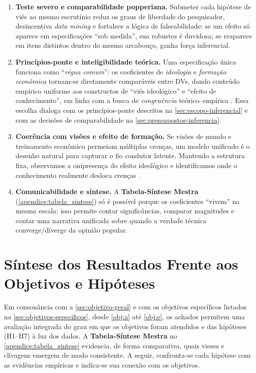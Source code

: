 \begin{enumerate}[label=\roman*)]
\item \textbf{Teste severo e comparabilidade popperiana.} Submeter cada hipótese de viés ao mesmo escrutínio reduz os graus de liberdade do pesquisador, desincentiva \emph{data mining} e fortalece a lógica de falseabilidade: se um efeito só aparece em especificações “sob medida”, sua robustez é duvidosa; se reaparece em itens distintos dentro do mesmo arcabouço, ganha força inferencial.

\item \textbf{Princípios-ponte e inteligibilidade teórica.} Uma especificação única funciona como “\emph{régua comum}”: os coeficientes de \emph{ideologia} e \emph{formação econômica} tornam-se diretamente comparáveis entre DVs, dando conteúdo empírico uniforme aos constructos de “viés ideológico” e “efeito de conhecimento”, em linha com a busca de \emph{congruência} teórico–empírica \cite{stigum2003}. Essa escolha dialoga com os princípios-ponte descritos na \autoref{sec:escopo-inferencial} e com as decisões de comparabilidade na \autoref{sec:pressupostos-inferencia}.

\item \textbf{Coerência com visões e efeito de formação.} Se visões de mundo e treinamento econômico permeiam múltiplas crenças, um modelo unificado é o desenho natural para capturar o fio condutor latente. Mantendo a estrutura fixa, observamos a onipresença do efeito ideológico e identificamos onde o conhecimento realmente desloca crenças \cite{sowell2007conflict,newman2020ideia}. 

\item \textbf{Comunicabilidade e síntese.} A \textbf{Tabela-Síntese Mestra} (\autoref{apendice:tabela_sintese}) só é possível porque os coeficientes “vivem” na mesma escala: isso permite contar significâncias, comparar magnitudes e contar uma narrativa unificada sobre quando a verdade técnica converge/diverge da opinião popular.
\end{enumerate}

\section{Síntese dos Resultados Frente aos Objetivos e Hipóteses}\label{sec:sintese-resultados}

Em consonância com a \autoref{sec:objetivo-geral} e com os objetivos específicos listados na \autoref{sec:objetivos-especificos}, desde \autoref{obj:a} até \autoref{obj:e}, os achados permitem uma avaliação integrada do grau em que os objetivos foram atendidos e das hipóteses (H1–H7) à luz dos dados. A \textbf{Tabela-Síntese Mestra} no \autoref{apendice:tabela_sintese} evidencia, de forma comparativa, quais vieses e clivagens emergem de modo consistente. A seguir, confronta-se cada hipótese com as evidências empíricas e indica-se sua conexão com os objetivos.

